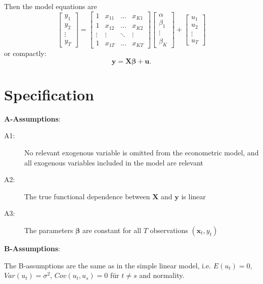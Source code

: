 \documentclass{article}
\begin{document}
Then the model equations are
\begin{equation*}
\left[ 
\begin{array}{l}
y_{1} \\ 
y_{2} \\ 
\vdots \\ 
y_{T}%
\end{array}%
\right] =\left[ 
\begin{array}{llll}
1 & x_{11} & \ldots & x_{K1} \\ 
1 & x_{12} & \ldots & x_{K2} \\ 
\vdots & \vdots & \ddots & \vdots \\ 
1 & x_{1T} & \ldots & x_{KT}%
\end{array}%
\right] \left[ 
\begin{array}{l}
\alpha \\ 
\beta _{1} \\ 
\vdots \\ 
\beta _{K}%
\end{array}%
\right] +\left[ 
\begin{array}{l}
u_{1} \\ 
u_{2} \\ 
\vdots \\ 
u_{T}%
\end{array}%
\right]
\end{equation*}
or compactly:
\[ \mathbf{y}=\mathbf{X\beta }+\mathbf{u}. \]

\section{Specification}

\textbf{A-Assumptions}:
\begin{description}
\item[A1:] No relevant exogenous variable is omitted from the
econometric model, and all exogenous variables included in the model are
relevant
\item[A2:] The true functional dependence between $\mathbf{X}$
and $\mathbf{y}$ is linear
\item[A3:] The parameters $\mathbf{\beta }$ are constant for all $%
T$ observations $(\mathbf{x}_{t},y_{t})$ 
\end{description}

\textbf{B-Assumptions}:

The B-assumptions are the same as in the simple linear model, i.e. $E(u_{t})=0$, $Var(u_{t})=\sigma ^{2}$, 
$Cov(u_{t},u_{s})=0$ für $t\neq s$ and normality.
\end{document}
